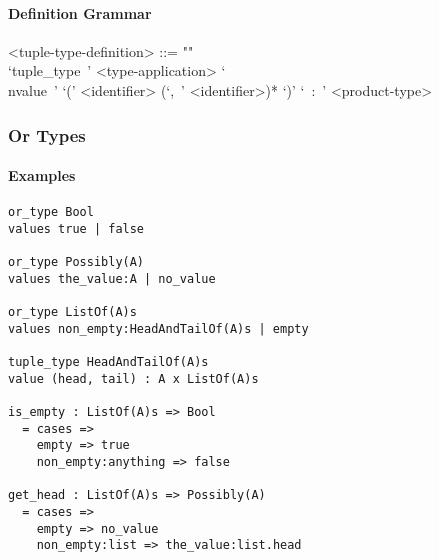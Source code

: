 \documentclass{article}
\begin{document}
\paragraph{Definition Grammar}
\begin{grammar}
<tuple-type-definition> ::= ""\\
`tuple_type\ ' <type-application>
`\\nvalue\ ' `(' <identifier> (`,\ ' <identifier>)* `)' `\ :\ ' <product-type>
\end{grammar}

\subsubsection{Or Types}

\paragraph{Examples}

\begin{verbatim}
or_type Bool
values true | false

or_type Possibly(A)
values the_value:A | no_value

or_type ListOf(A)s
values non_empty:HeadAndTailOf(A)s | empty

tuple_type HeadAndTailOf(A)s
value (head, tail) : A x ListOf(A)s

is_empty : ListOf(A)s => Bool
  = cases => 
    empty => true
    non_empty:anything => false

get_head : ListOf(A)s => Possibly(A)
  = cases => 
    empty => no_value
    non_empty:list => the_value:list.head
\end{verbatim}
\end{document}
